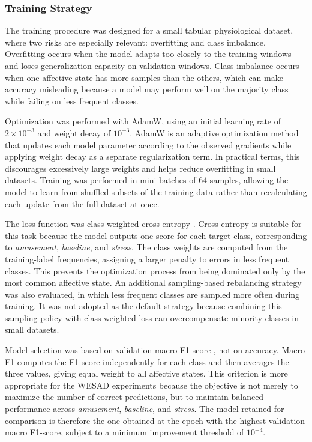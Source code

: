 \documentclass[12pt]{article}
\begin{document}
\subsubsection{Training Strategy}

The training procedure was designed for a small tabular physiological dataset, where two risks are especially relevant: overfitting and class imbalance. Overfitting occurs when the model adapts too closely to the training windows and loses generalization capacity on validation windows. Class imbalance occurs when one affective state has more samples than the others, which can make accuracy misleading because a model may perform well on the majority class while failing on less frequent classes.

Optimization was performed with AdamW\cite{loshchilov2019decoupled}, using an initial learning rate of $2 \times 10^{-3}$ and weight decay of $10^{-3}$. AdamW is an adaptive optimization method that updates each model parameter according to the observed gradients while applying weight decay as a separate regularization term. In practical terms, this discourages excessively large weights and helps reduce overfitting in small datasets. Training was performed in mini-batches of 64 samples, allowing the model to learn from shuffled subsets of the training data rather than recalculating each update from the full dataset at once.

The loss function was class-weighted cross-entropy \cite{goodfellow2016deep}. Cross-entropy is suitable for this task because the model outputs one score for each target class, corresponding to \textit{amusement}, \textit{baseline}, and \textit{stress}. The class weights are computed from the training-label frequencies, assigning a larger penalty to errors in less frequent classes. This prevents the optimization process from being dominated only by the most common affective state. An additional sampling-based rebalancing strategy was also evaluated, in which less frequent classes are sampled more often during training. It was not adopted as the default strategy because combining this sampling policy with class-weighted loss can overcompensate minority classes in small datasets.

Model selection was based on validation macro F1-score \cite{sokolova2009systematic}, not on accuracy. Macro F1 computes the F1-score independently for each class and then averages the three values, giving equal weight to all affective states. This criterion is more appropriate for the WESAD experiments because the objective is not merely to maximize the number of correct predictions, but to maintain balanced performance across \textit{amusement}, \textit{baseline}, and \textit{stress}. The model retained for comparison is therefore the one obtained at the epoch with the highest validation macro F1-score, subject to a minimum improvement threshold of $10^{-4}$.
\end{document}
